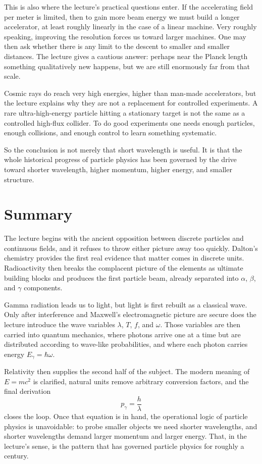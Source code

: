 This is also where the lecture's practical questions enter. If the accelerating field per meter is limited, then to gain more beam energy we must build a longer accelerator, at least roughly linearly in the case of a linear machine. Very roughly speaking, improving the resolution forces us toward larger machines. One may then ask whether there is any limit to the descent to smaller and smaller distances. The lecture gives a cautious answer: perhaps near the Planck length something qualitatively new happens, but we are still enormously far from that scale.

Cosmic rays do reach very high energies, higher than man-made accelerators, but the lecture explains why they are not a replacement for controlled experiments. A rare ultra-high-energy particle hitting a stationary target is not the same as a controlled high-flux collider. To do good experiments one needs enough particles, enough collisions, and enough control to learn something systematic.

So the conclusion is not merely that short wavelength is useful. It is that the whole historical progress of particle physics has been governed by the drive toward shorter wavelength, higher momentum, higher energy, and smaller structure.

\section{Summary}

The lecture begins with the ancient opposition between discrete particles and continuous fields, and it refuses to throw either picture away too quickly. Dalton's chemistry provides the first real evidence that matter comes in discrete units. Radioactivity then breaks the complacent picture of the elements as ultimate building blocks and produces the first particle beam, already separated into \(\alpha\), \(\beta\), and \(\gamma\) components.

Gamma radiation leads us to light, but light is first rebuilt as a classical wave. Only after interference and Maxwell's electromagnetic picture are secure does the lecture introduce the wave variables \(\lambda\), \(T\), \(f\), and \(\omega\). Those variables are then carried into quantum mechanics, where photons arrive one at a time but are distributed according to wave-like probabilities, and where each photon carries energy \(E_\gamma=\hbar\omega\).

Relativity then supplies the second half of the subject. The modern meaning of \(E=mc^2\) is clarified, natural units remove arbitrary conversion factors, and the final derivation
\begin{equation}
p_\gamma = \frac{h}{\lambda}
\end{equation}
closes the loop. Once that equation is in hand, the operational logic of particle physics is unavoidable: to probe smaller objects we need shorter wavelengths, and shorter wavelengths demand larger momentum and larger energy. That, in the lecture's sense, is the pattern that has governed particle physics for roughly a century.
